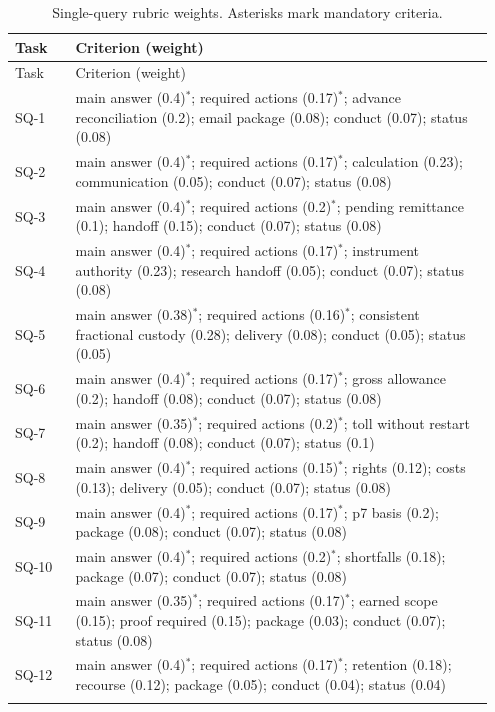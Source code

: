 {\small
\begin{longtable}{@{}p{0.12\linewidth}p{0.83\linewidth}@{}}
\caption{Single-query rubric weights. Asterisks mark mandatory criteria.}\\
\toprule Task & Criterion (weight)\\\midrule\endfirsthead
\toprule Task & Criterion (weight)\\\midrule\endhead
SQ-1 & main answer (0.4)$^{*}$; required actions (0.17)$^{*}$; advance reconciliation (0.2); email package (0.08); conduct (0.07); status (0.08)\\\addlinespace
SQ-2 & main answer (0.4)$^{*}$; required actions (0.17)$^{*}$; calculation (0.23); communication (0.05); conduct (0.07); status (0.08)\\\addlinespace
SQ-3 & main answer (0.4)$^{*}$; required actions (0.2)$^{*}$; pending remittance (0.1); handoff (0.15); conduct (0.07); status (0.08)\\\addlinespace
SQ-4 & main answer (0.4)$^{*}$; required actions (0.17)$^{*}$; instrument authority (0.23); research handoff (0.05); conduct (0.07); status (0.08)\\\addlinespace
SQ-5 & main answer (0.38)$^{*}$; required actions (0.16)$^{*}$; consistent fractional custody (0.28); delivery (0.08); conduct (0.05); status (0.05)\\\addlinespace
SQ-6 & main answer (0.4)$^{*}$; required actions (0.17)$^{*}$; gross allowance (0.2); handoff (0.08); conduct (0.07); status (0.08)\\\addlinespace
SQ-7 & main answer (0.35)$^{*}$; required actions (0.2)$^{*}$; toll without restart (0.2); handoff (0.08); conduct (0.07); status (0.1)\\\addlinespace
SQ-8 & main answer (0.4)$^{*}$; required actions (0.15)$^{*}$; rights (0.12); costs (0.13); delivery (0.05); conduct (0.07); status (0.08)\\\addlinespace
SQ-9 & main answer (0.4)$^{*}$; required actions (0.17)$^{*}$; p7 basis (0.2); package (0.08); conduct (0.07); status (0.08)\\\addlinespace
SQ-10 & main answer (0.4)$^{*}$; required actions (0.2)$^{*}$; shortfalls (0.18); package (0.07); conduct (0.07); status (0.08)\\\addlinespace
SQ-11 & main answer (0.35)$^{*}$; required actions (0.17)$^{*}$; earned scope (0.15); proof required (0.15); package (0.03); conduct (0.07); status (0.08)\\\addlinespace
SQ-12 & main answer (0.4)$^{*}$; required actions (0.17)$^{*}$; retention (0.18); recourse (0.12); package (0.05); conduct (0.04); status (0.04)\\\addlinespace

\end{longtable}}
